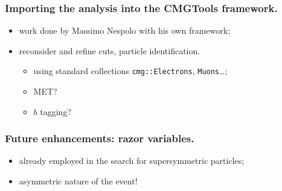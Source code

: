 \documentclass[ukenglish]{beamer}
\begin{document}
\begin{frame}
    \frametitle{Importing the analysis into the CMGTools framework.}
    \begin{itemize}
        \item work done by Massimo Nespolo with his own framework;
        \item reconsider and refine cuts, particle identification.
            \begin{itemize}
                \item using standard collections \texttt{cmg::Electrons},
                    \texttt{Muons}\dots;
                \item MET?
                \item $b$ tagging?
            \end{itemize}
    \end{itemize}
\end{frame}

\begin{frame}
    \frametitle{Future enhancements: razor variables.}
    \begin{itemize}
        \item already employed in the search for supersymmetric particles;
        \item \alert{asymmetric nature of the event!}
    \end{itemize}
\end{frame}
\end{document}
